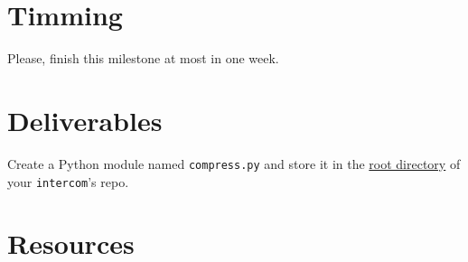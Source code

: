 \section{Timming}

Please, finish this milestone at most in one week.

\section{Deliverables}

Create a Python module named \texttt{compress.py} and store it in the
\href{https://github.com/Tecnologias-multimedia/intercom}{root
  directory} of your \texttt{intercom}'s repo.

\section{Resources}


